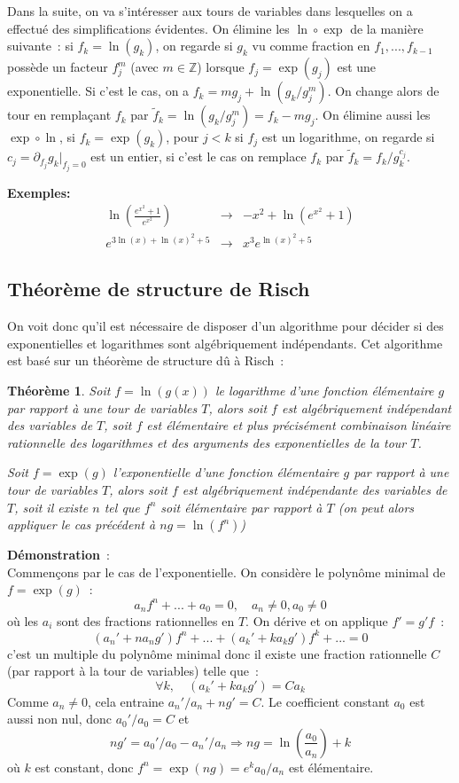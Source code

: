 \documentclass[a4paper,11pt]{book}
\newtheorem{thm}{Théorème}
\begin{document}
\begin{giacjshere}
Dans la suite, on va s'intéresser aux tours de variables dans lesquelles 
on a effectué des simplifications évidentes.
On élimine les $\ln \circ \exp$ de la manière suivante~:
si $f_k=\ln(g_k)$, on regarde si $g_k$ vu comme fraction 
en $f_1,...,f_{k-1}$ possède un facteur $f_j^m$ (avec $m \in \mathbb{Z}$)
lorsque $f_j=\exp(g_j)$ est une exponentielle.
Si c'est le cas, on a $f_k= m g_j + \ln(g_k/g_j^m)$. On change
alors de tour en remplaçant $f_k$ par $\tilde{f}_k=\ln(g_k/g_j^m)=f_k-mg_j$.
On élimine aussi les $\exp \circ \ln$, si
$f_k=\exp(g_k)$, pour $j<k$ si $f_j$ est un logarithme,
on regarde si $c_j=\partial_{f_j}g_k|_{f_j=0}$ est un entier, si
c'est le cas on remplace $f_k$ par $\tilde{f}_k=f_k/g_k^{c_j}$.

{\bf Exemples: }
\begin{eqnarray*}
 \ln(\frac{e^{x^2}+1}{e^{x^2}}) &\rightarrow &-x^2 + \ln(e^{x^2}+1) \\
e^{3 \ln(x)+\ln(x)^2+5} & \rightarrow & x^3 e^{\ln(x)^2+5} 
\end{eqnarray*}


\subsection{Théorème de structure de Risch}
On voit donc qu'il est nécessaire de disposer d'un algorithme
pour décider si des exponentielles et logarithmes sont
algébriquement indépendants. Cet algorithme est basé sur
un théorème de structure dû à Risch~:
\begin{thm}
Soit $f=\ln(g(x))$ le logarithme d'une fonction élémentaire
$g$ par rapport à une tour de variables $T$, alors soit $f$
est algébriquement indépendant des variables de $T$, soit $f$ est
élémentaire et plus précisément combinaison linéaire rationnelle
des logarithmes et des arguments des exponentielles de la tour $T$.

Soit $f=\exp(g)$ l'exponentielle d'une fonction élémentaire $g$
par rapport à une tour de variables $T$, alors soit $f$
est algébriquement indépendante des variables de $T$, soit
il existe $n$ tel que $f^n$ soit élémentaire par rapport à $T$ 
(on peut alors appliquer le cas précédent à $ng=\ln(f^n)$)
\end{thm}

{\bf Démonstration}~:\\
Commençons par le cas de l'exponentielle. On considère le polynôme minimal
de $f=\exp(g)$~:
\[ a_n f^n+...+a_0=0, \quad a_n \neq 0 , a_0 \neq 0\]
où les $a_i$ sont des fractions rationnelles en $T$. On dérive
et on applique $f'=g'f$~:
\[ (a_n'+n a_n g') f^n +   ... + ( a_{k}' + ka_k g')f^{k} +... =0\]
c'est un multiple du polynôme minimal donc il existe une fraction rationnelle
$C$ (par rapport à la tour de variables) telle que~:
\[ \forall k, \quad (a_k'+k a_k g') = C a_k\]
Comme $a_n\neq 0$, cela entraine $a_n'/a_n+ng'=C$. Le coefficient
constant $a_0$ est aussi non nul, donc $a_0'/a_0=C$ et 
\[ n g' = a_0'/a_0 - a_n'/a_n \Rightarrow ng=\ln(\frac{a_0}{a_n}) + k\]
où $k$ est constant, donc $f^n=\exp(ng)=e^k a_0/a_n$ est élémentaire.


\end{giacjshere}
\end{document}

